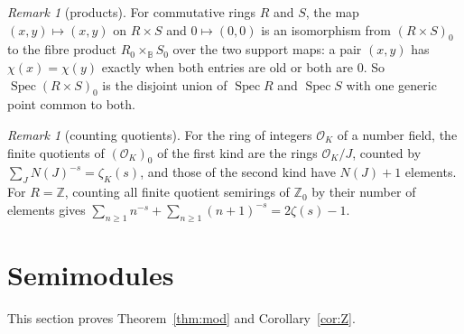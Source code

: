 \documentclass[11pt]{amsart}
\theoremstyle{remark}
\newtheorem{remark}[thm]{Remark}
\newcommand{\B}{\mathbb B}
\DeclareMathOperator{\Spec}{Spec}
\begin{document}
\begin{remark}[products]\label{rem:product}
For commutative rings $R$ and $S$, the map $(x,y)\mapsto(x,y)$ on $R\times S$ and $0\mapsto(0,0)$ is an isomorphism from $(R\times S)_0$ to the fibre product $R_0\times_\B S_0$ over the two support maps: a pair $(x,y)$ has $\chi(x)=\chi(y)$ exactly when both entries are old or both are $0$. So $\Spec(R\times S)_0$ is the disjoint union of $\Spec R$ and $\Spec S$ with one generic point common to both.
\end{remark}

\begin{remark}[counting quotients]
For the ring of integers $\mathcal O_K$ of a number field, the finite quotients of $(\mathcal O_K)_0$ of the first kind are the rings $\mathcal O_K/J$, counted by $\sum_JN(J)^{-s}=\zeta_K(s)$, and those of the second kind have $N(J)+1$ elements. For $R=\mathbb Z$, counting all finite quotient semirings of $\mathbb Z_0$ by their number of elements gives $\sum_{n\ge1}n^{-s}+\sum_{n\ge1}(n+1)^{-s}=2\zeta(s)-1$.
\end{remark}

\section{Semimodules}\label{sec:mod}

This section proves Theorem~\ref{thm:mod} and Corollary~\ref{cor:Z}.
\end{document}
